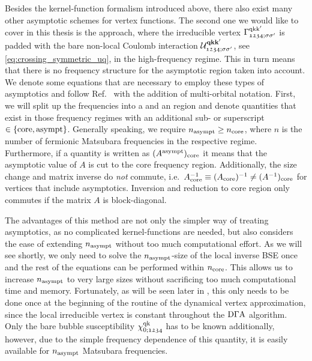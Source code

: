 \documentclass[../../main.tex]{subfiles}
\begin{document}
Besides the kernel-function formalism introduced above, there also exist many other asymptotic schemes for vertex functions. The second one we would like to cover in this thesis is the  approach, where the irreducible vertex $\Gamma_{\mathfrak{1234};\sigma\sigma'}^{\text{q}\text{k}\text{k}'}$ is padded with the bare non-local Coulomb interaction $\mathcal{U}^{\textbf{qkk}'}_{\mathfrak{1234};\sigma\sigma'}$, see \eqref{eq:crossing_symmetric_uq}, in the high-frequency regime. This in turn means that there is no frequency structure for the asymptotic region taken into account. We denote some equations that are necessary to employ these types of asymptotics and follow Ref.~\cite{Kitatani2022} with the addition of multi-orbital notation. First, we will split up the frequencies into a  and an  region and denote quantities that exist in those frequency regimes with an additional sub- or superscript $\in\{\text{core}, \text{asympt}\}$. Generally speaking, we require $n_{\text{asympt}}\ge n_{\text{core}}$, where $n$ is the number of fermionic Matsubara frequencies in the respective regime. Furthermore, if a quantity is written as $(A^{\text{asympt}})_\text{core}$ it means that the asymptotic value of $A$ is cut to the core frequency region. Additionally, the size change and matrix inverse do \textit{not} commute, i.e.\ $A^{-1}_{\text{core}}\equiv (A_{\text{core}})^{-1}\neq (A^{-1})_{\text{core}}$ for vertices that include asymptotics. Inversion and reduction to core region only commutes if the matrix $A$ is block-diagonal.

The advantages of this method are not only the simpler way of treating asymptotics, as no complicated kernel-functions are needed, but also considers the ease of extending $n_{\text{asympt}}$ without too much computational effort. As we will see shortly, we only need to solve the $n_{\text{asympt}}$-size of the local inverse BSE once and the rest of the equations can be performed within $n_{\text{core}}$. This allows us to increase $n_{\text{asympt}}$ to very large sizes without sacrificing too much computational time and memory. Fortunately, as will be seen later in , this only needs to be done once at the beginning of the routine of the dynamical vertex approximation, since the local irreducible vertex is constant throughout the $\text{D}\Gamma\text{A}$ algorithm. Only the bare bubble susceptibility $\chi_{0;\mathfrak{1234}}^{\text{q}\text{k}}$ has to be known additionally, however, due to the simple frequency dependence of this quantity, it is easily available for $n_{\text{asympt}}$ Matsubara frequencies.
\end{document}
